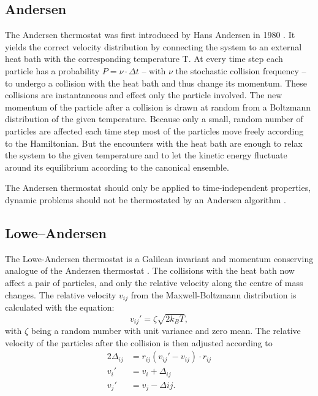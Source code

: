 \subsection{Andersen}

The Andersen thermostat was first introduced by Hans Andersen in 1980 \cite{Andersen1}.
It yields the correct velocity distribution by connecting the system to an external heat bath with the corresponding temperature T.
At every time step each particle has a probability $P=\nu\cdot\Delta t$ -- with $\nu$ the stochastic collision frequency -- to undergo a collision with the heat bath and thus change its momentum. These collisions are instantaneous and effect only the particle involved.
The new momentum of the particle after a collision is drawn at random from a Boltzmann distribution of the given temperature.
Because only a small, random number of particles are affected each time step most of the particles move freely according to the Hamiltonian. But the encounters with the heat bath are enough to relax the system to the given temperature and to let the kinetic energy fluctuate around its equilibrium according to the canonical ensemble.

The Andersen thermostat should only be applied to time-independent properties, dynamic problems should not be thermostated by an Andersen algorithm \cite{Andersen2}.

\subsection{Lowe--Andersen}
The Lowe-Andersen thermostat is a Galilean invariant and momentum conserving analogue of the Andersen thermostat \cite{LoweAndersen}.
The collisions with the heat bath now affect a pair of particles, and only the relative velocity along the centre of mass changes. The relative velocity $v_{ij}$ from the Maxwell-Boltzmann distribution is calculated with the equation:
\begin{equation}
v_{ij}'=\zeta\sqrt{2k_BT},
\end{equation}
with $\zeta$ being a random number with unit variance and zero mean.
The relative velocity of the particles after the collision is then adjusted according to
\begin{align}
2\Delta_{ij}&=r_{ij}(v_{ij}'-v_{ij})\cdot r_{ij}\\
v_i'&=v_i+\Delta_{ij}\\
v_j'&=v_j-\Delta{ij}.\\
\end{align}

